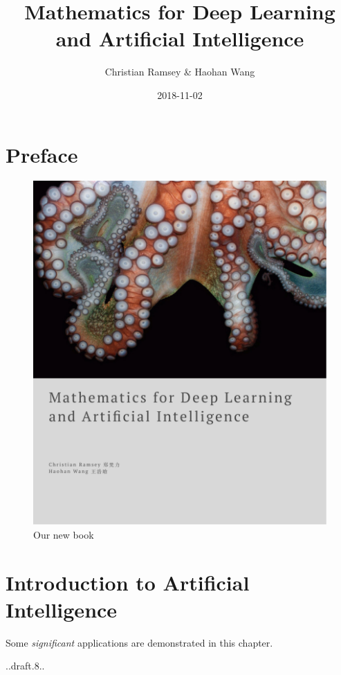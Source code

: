 \documentclass[]{book}
\title{Mathematics for Deep Learning and Artificial Intelligence}
\author{Christian Ramsey \& Haohan Wang}
\date{2018-11-02}
\theoremstyle{definition}
\theoremstyle{definition}
\theoremstyle{definition}
\theoremstyle{remark}
\begin{document}
\maketitle

{
\hypersetup{linkcolor=black}
\setcounter{tocdepth}{1}
\tableofcontents
}
\chapter*{Preface}\label{preface}

\begin{figure}
\centering
\includegraphics{artwork/maths of deep learning.png}
\caption{Our new book}
\end{figure}

\chapter{Introduction to Artificial Intelligence}\label{intro}

Some \emph{significant} applications are demonstrated in this chapter.

..draft.8..
\end{document}
